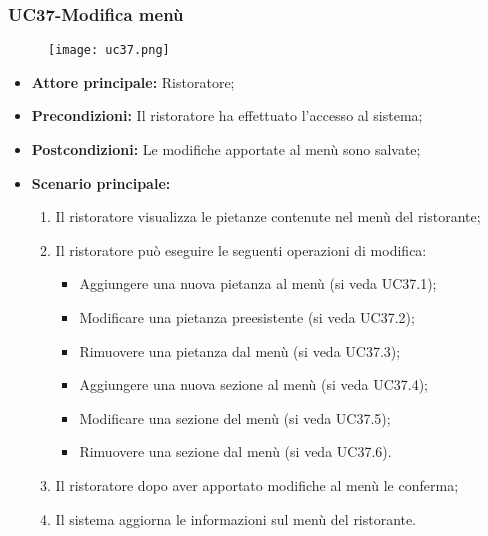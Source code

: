 \subsubsection{UC37-Modifica menù}
\begin{figure}[h] \texttt{[image: uc37.png]} \end{figure}
\begin{itemize}
    \item \textbf{Attore principale:} Ristoratore;
    \item \textbf{Precondizioni:} Il ristoratore ha effettuato l'accesso al sistema;
    \item \textbf{Postcondizioni:} Le modifiche apportate al menù sono salvate;
    \item \textbf{Scenario principale:}
    \begin{enumerate}
        \item Il ristoratore visualizza le pietanze contenute nel menù del ristorante;
        \item Il ristoratore può eseguire le seguenti operazioni di modifica:
        \begin{itemize}
           \item Aggiungere una nuova pietanza al menù (si veda UC37.1);
           \item Modificare una pietanza preesistente (si veda UC37.2);
           \item Rimuovere una pietanza dal menù (si veda UC37.3);
           \item Aggiungere una nuova sezione al menù (si veda UC37.4);
           \item Modificare una sezione del menù (si veda UC37.5);
           \item Rimuovere una sezione dal menù (si veda UC37.6).
        \end{itemize}
        \item Il ristoratore dopo aver apportato modifiche al menù le conferma;
        \item Il sistema aggiorna le informazioni sul menù del ristorante.
    \end{enumerate}
\end{itemize}

